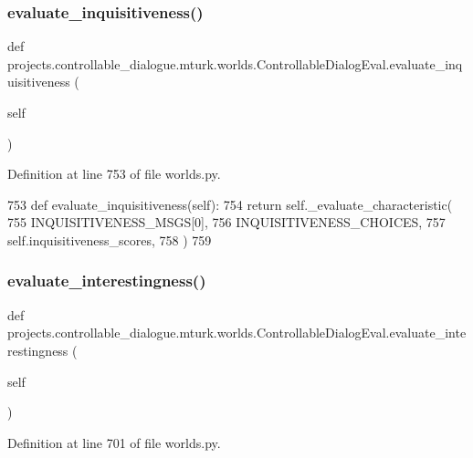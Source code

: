 \subsubsection{\texorpdfstring{evaluate\+\_\+inquisitiveness()}{evaluate\_inquisitiveness()}}
{\footnotesize\ttfamily def projects.\+controllable\+\_\+dialogue.\+mturk.\+worlds.\+Controllable\+Dialog\+Eval.\+evaluate\+\_\+inquisitiveness (\begin{DoxyParamCaption}\item[{}]{self }\end{DoxyParamCaption})}



Definition at line 753 of file worlds.\+py.


\begin{DoxyCode}
753     \textcolor{keyword}{def }evaluate\_inquisitiveness(self):
754         \textcolor{keywordflow}{return} self.\_evaluate\_characteristic(
755             INQUISITIVENESS\_MSGS[0],
756             INQUISITIVENESS\_CHOICES,
757             self.inquisitiveness\_scores,
758         )
759 
\end{DoxyCode}
\mbox{\label{classprojects_1_1controllable__dialogue_1_1mturk_1_1worlds_1_1ControllableDialogEval_a2316627ec10b57561396a38fe3628e2f}} 
\subsubsection{\texorpdfstring{evaluate\+\_\+interestingness()}{evaluate\_interestingness()}}
{\footnotesize\ttfamily def projects.\+controllable\+\_\+dialogue.\+mturk.\+worlds.\+Controllable\+Dialog\+Eval.\+evaluate\+\_\+interestingness (\begin{DoxyParamCaption}\item[{}]{self }\end{DoxyParamCaption})}



Definition at line 701 of file worlds.\+py.


